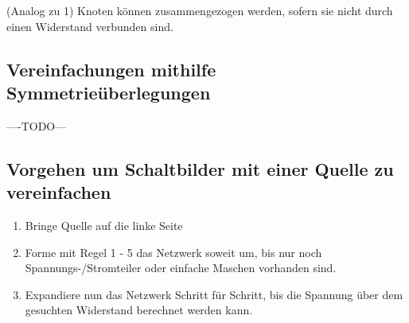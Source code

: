 										\iend
					\fix \fix
										\beginip
											(Analog zu 1) Knoten können zusammengezogen werden, sofern sie nicht durch einen Widerstand verbunden sind.
											\begin{center}

											\end{center}
										\iend

										\newpage


\subsection{Vereinfachungen mithilfe Symmetrieüberlegungen}
----TODO---




										\subsection{Vorgehen um Schaltbilder mit einer Quelle zu vereinfachen}
										\begin{enumerate}
											\item Bringe Quelle auf die linke Seite
											\item Forme mit Regel 1 - 5 das Netzwerk soweit um, bis nur noch Spannungs-/Stromteiler oder einfache Maschen vorhanden sind.
											\item Expandiere nun das Netzwerk Schritt für Schritt, bis die Spannung über dem gesuchten Widerstand berechnet werden kann.
										\end{enumerate}

